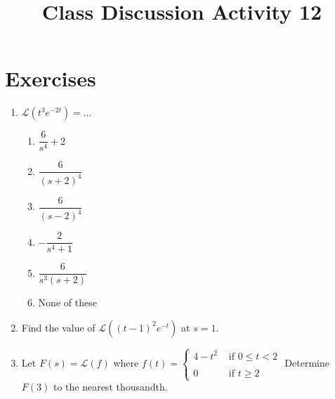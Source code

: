 \documentclass{ximera}
\begin{document}
\begin{abstract}
 \end{abstract}

    \title{Class Discussion Activity 12}
    
    \maketitle

\section*{Exercises}



\begin{enumerate}[label=(\arabic*)]


\item $\displaystyle \mathcal{L}(t^3e^{-2t})=\ldots$

\begin{enumerate}[label=(\alph*)]
\item $\dfrac{6}{s^4}+2$
\item $\dfrac{6}{(s+2)^4}$  %
\item $\dfrac{6}{(s-2)^4}$
\item $-\dfrac{2}{s^4+1}$
\item $\dfrac{6}{s^3(s+2)}$ 
\item None of these
\end{enumerate}


\item Find the value of $\mathcal{L}((t-1)^2e^{-t})$ at $s=1$.  





\item Let $F(s)=\mathcal{L}(f)$ where $f(t)=\left\{
     \begin{array}{lr}
       4-t^2 & \mbox{ if }0\leq t<2\\
       \\
       0 &  \mbox{ if }t\geq 2
     \end{array}\right.$  Determine $F(3)$ to the nearest thousandth.








\end{enumerate}
\end{document}
